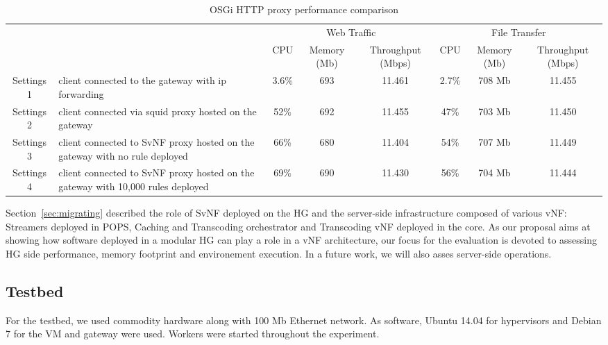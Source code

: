\begin{table*}
	\centering
	\begin{tabular}{| c | p{}|c |c |c || c |c |c |}
	
	
 	    \multicolumn{2}{c}{} & \multicolumn{3}{c}{Web Traffic} 		  & \multicolumn{3}{c}{File Transfer} \\
 	     \cline{3-8}	
             \multicolumn{2}{c|}{} & CPU 			& Memory (Mb) 		& Throughput (Mbps)	& CPU 		& Memory (Mb)		& Throughput (Mbps) \\\hline   
Settings 1 & client connected to the gateway with ip forwarding &   3.6\% 		& 693 		& 11.461		& 2.7\%		& 708 Mb		& 11.455 \\\hline
Settings 2 & client connected via squid proxy hosted on the gateway   &   52\%        & 692 		& 11.455		& 47\%		& 703 Mb		& 11.450 \\\hline
Settings 3 & client connected to SvNF proxy hosted on the gateway with no rule deployed &   66\%		& 680 		& 11.404		& 54\%		& 707 Mb		& 11.449 \\\hline
Settings 4 & client connected to SvNF proxy hosted on the gateway with 10,000 rules deployed   &   69\%        & 690 		& 11.430		& 56\%		& 704 Mb		& 11.444 \\\hline

	
	
	            
	\end{tabular}
	\caption{
	OSGi HTTP proxy performance comparison
	\label{tab:perf-comparison}
	}
	
\end{table*}

Section~\ref{sec:migrating} described the role of SvNF deployed on the HG and the server-side infrastructure composed of various vNF: Streamers deployed in POPS, Caching and Transcoding orchestrator and Transcoding vNF deployed in the core.
As our proposal aims at showing how software deployed in a modular HG can play a role in a vNF architecture, our focus for the evaluation is devoted to assessing HG side performance, memory footprint and environement execution. In a future work, we will also asses server-side operations.


\subsection{Testbed}

For the testbed, we used commodity hardware along with 100 Mb Ethernet network. As software, Ubuntu 14.04 for hypervisors and Debian 7 for the VM and gateway were used. Workers were started throughout the experiment.
  
